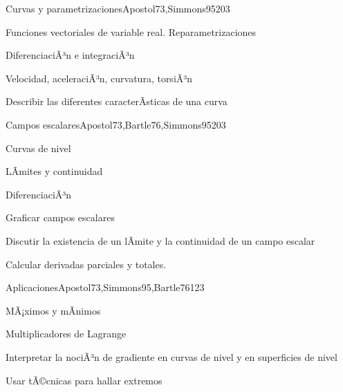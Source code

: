 \begin{syllabus}
\begin{unit}{Curvas y parametrizaciones}{Apostol73,Simmons95}{20}{3}
   \begin{topics}
      \item Funciones vectoriales de variable real. Reparametrizaciones
      \item DiferenciaciÃ³n e integraciÃ³n
      \item Velocidad, aceleraciÃ³n, curvatura, torsiÃ³n
      \end{topics}

   \begin{learningoutcomes}
      \item Describir las diferentes caracterÃ­sticas de una curva
      \end{learningoutcomes}
\end{unit}

\begin{unit}{Campos escalares}{Apostol73,Bartle76,Simmons95}{20}{3}
   \begin{topics}
      \item Curvas de nivel
      \item LÃ­mites y continuidad
      \item DiferenciaciÃ³n
      \end{topics}

   \begin{learningoutcomes}
      \item Graficar campos escalares
      \item Discutir la existencia de un lÃ­mite y la continuidad de un campo escalar
      \item Calcular derivadas parciales y totales.
      \end{learningoutcomes}
\end{unit}

\begin{unit}{Aplicaciones}{Apostol73,Simmons95,Bartle76}{12}{3}
   \begin{topics}
      \item MÃ¡ximos y mÃ­nimos
      \item Multiplicadores de Lagrange
      \end{topics}

   \begin{learningoutcomes}
      \item Interpretar la nociÃ³n de gradiente en curvas de nivel y en superficies de nivel
      \item Usar tÃ©cnicas para hallar extremos
      \end{learningoutcomes}
\end{unit}


\end{syllabus}
